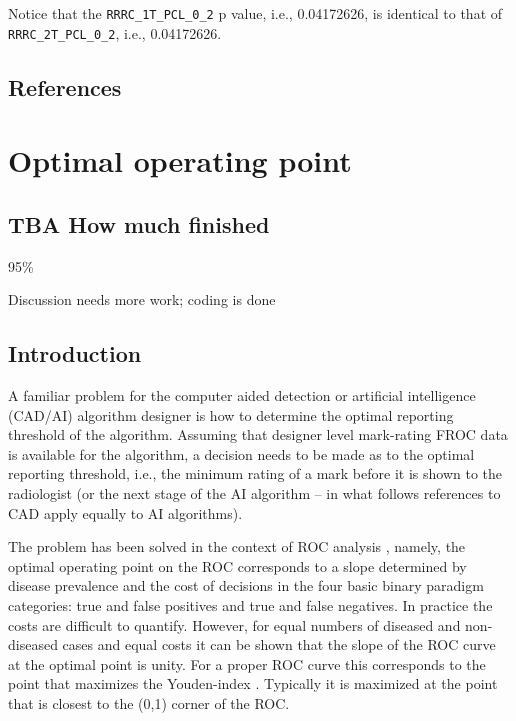 \documentclass[
]{book}
\begin{document}
Notice that the \texttt{RRRC\_1T\_PCL\_0\_2} p value, i.e., 0.04172626, is identical to that of \texttt{RRRC\_2T\_PCL\_0\_2}, i.e., 0.04172626.

\hypertarget{standalone-cad-radiologists-references}{%
\section{References}\label{standalone-cad-radiologists-references}}

\hypertarget{optim-op-point}{%
\chapter{Optimal operating point}\label{optim-op-point}}

\hypertarget{optim-op-point-how-much-finished}{%
\section{TBA How much finished}\label{optim-op-point-how-much-finished}}

95\%

Discussion needs more work; coding is done

\hypertarget{optim-op-point-intro}{%
\section{Introduction}\label{optim-op-point-intro}}

A familiar problem for the computer aided detection or artificial intelligence (CAD/AI) algorithm designer is how to determine the optimal reporting threshold of the algorithm. Assuming that designer level mark-rating FROC data is available for the algorithm, a decision needs to be made as to the optimal reporting threshold, i.e., the minimum rating of a mark before it is shown to the radiologist (or the next stage of the AI algorithm -- in what follows references to CAD apply equally to AI algorithms).

The problem has been solved in the context of ROC analysis \citep{metz1978rocmethodology}, namely, the optimal operating point on the ROC corresponds to a slope determined by disease prevalence and the cost of decisions in the four basic binary paradigm categories: true and false positives and true and false negatives. In practice the costs are difficult to quantify. However, for equal numbers of diseased and non-diseased cases and equal costs it can be shown that the slope of the ROC curve at the optimal point is unity. For a proper ROC curve this corresponds to the point that maximizes the Youden-index \citep{youden1950index}. Typically it is maximized at the point that is closest to the (0,1) corner of the ROC.
\end{document}
